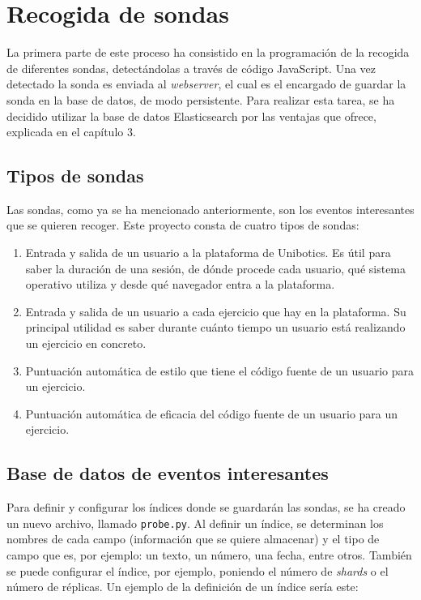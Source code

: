 \section{Recogida de sondas}
La primera parte de este proceso ha consistido en la programación de la recogida de diferentes sondas, detectándolas a través de código JavaScript. Una vez detectado la sonda es enviada al \textit{webserver}, el cual es el encargado de guardar la sonda en la base de datos, de modo persistente. Para realizar esta tarea, se ha decidido utilizar la base de datos Elasticsearch por las ventajas que ofrece, explicada en el capítulo 3.

\subsection{Tipos de sondas}
Las sondas, como ya se ha mencionado anteriormente, son los eventos interesantes que se quieren recoger. Este proyecto consta de cuatro tipos de sondas:
\begin{enumerate}
\item Entrada y salida de un usuario a la plataforma de Unibotics. Es útil para saber la duración de una sesión, de dónde procede cada usuario, qué sistema operativo utiliza y desde qué navegador entra a la plataforma.
\item Entrada y salida de un usuario a cada ejercicio que hay en la plataforma. Su principal utilidad es saber durante cuánto tiempo un usuario está realizando un ejercicio en concreto.
\item Puntuación automática de estilo que tiene el código fuente de un usuario para un ejercicio.
\item Puntuación automática de eficacia del código fuente de un usuario para un ejercicio.
\end{enumerate}
\newpage
\subsection{Base de datos de eventos interesantes}
Para definir y configurar los índices donde se guardarán las sondas, se ha creado un nuevo archivo, llamado \texttt{probe.py}. Al definir un índice, se determinan los nombres de cada campo (información que se quiere almacenar) y el tipo de campo que es, por ejemplo: un texto, un número, una fecha, entre otros. También se puede configurar el índice, por ejemplo, poniendo el número de\textit{ shards }o el número de réplicas. Un ejemplo de la definición de un índice sería este: \\

